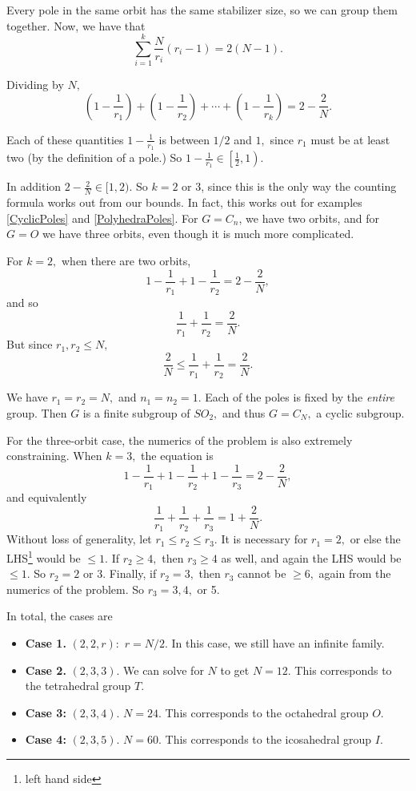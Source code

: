 Every pole in the same orbit has the same stabilizer size, so we can group them together.
Now, we have that 
\[
\sum_{i = 1}^k \frac{N}{r_i}(r_i-1) = 2(N-1). 
\]

Dividing by $N,$
\[
\left(1 - \frac{1}{r_1}\right) + \left(1 - \frac{1}{r_2}\right) + \cdots + \left(1 - \frac{1}{r_k}\right) = 2 - \frac{2}{N}.
\]

Each of these quantities $1 - \frac{1}{r_1}$ is between $1/2$ and $1,$ since $r_1$ must be at least two (by the definition of a pole.) %
So $1 - \frac{1}{r_1} \in \left[\frac{1}{2}, 1\right).$

In addition $2 - \frac{2}{N} \in [1, 2).$ So $k = 2$ or 3, since this is the only way the counting formula works out from our bounds. 
In fact, this works out for examples \ref{CyclicPoles} and \ref{PolyhedraPoles}. 
For $G=C_n$, we have two orbits, and for $G=O$ we have three orbits, even though it is much more complicated.

For $k = 2,$ when there are two orbits, 
\[
1 - \frac{1}{r_1} + 1 - \frac{1}{r_2} = 2 - \frac{2}{N},
\]
and so
\[
\frac{1}{r_1} + \frac{1}{r_2} = \frac{2}{N}.
\]
But since $r_1, r_2 \leq N,$ 
\[
\frac{2}{N} \leq \frac{1}{r_1} + \frac{1}{r_2} = \frac{2}{N}.
\]

We have $r_1 = r_2 = N,$ and $n_1 = n_2 = 1.$ Each of the poles is fixed by the \emph{entire} group. Then $G$ is a finite subgroup of $SO_2,$ and thus $G = C_N,$ a cyclic subgroup.

For the three-orbit case, the numerics of the problem is also extremely constraining. When $k = 3,$ the equation is 
\[
1 - \frac{1}{r_1} + 1 - \frac{1}{r_2} + 1 - \frac{1}{r_3} = 2 - \frac{2}{N},
\]
and equivalently 
\[
\frac{1}{r_1} + \frac{1}{r_2} + \frac{1}{r_3} = 1 + \frac{2}{N}.
\]
Without loss of generality, let $r_1 \leq r_2 \leq r_3.$ It is necessary for $r_1 = 2,$ or else the LHS\footnote{left hand side} would be $\leq 1.$ If $r_2\geq 4,$ then $r_3 \geq 4$ as well, and again the LHS would be $\leq 1.$ So $r_2 = 2$ or $3.$ Finally, if $r_2 = 3,$ then $r_3$ cannot be $\geq 6,$ again from the numerics of the problem. So $r_3 = 3, 4,$ or 5. 

In total, the cases are 
\begin{itemize}
    \item \textbf{Case 1.} $(2, 2, r):$ $r = N/2$. In this case, we still have an infinite family. 
    \item \textbf{Case 2.} $(2, 3, 3)$. We can solve for $N$ to get $N = 12.$ This corresponds to the tetrahedral group $T.$
    \item \textbf{Case 3:} $(2, 3, 4)$. $N = 24$. This corresponds to the octahedral group $O.$
    \item \textbf{Case 4:} $(2, 3, 5)$. $N = 60.$ This corresponds to the icosahedral group $I.$
\end{itemize}

